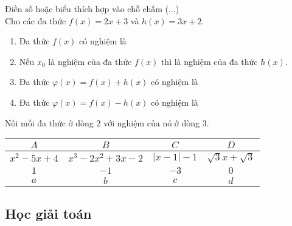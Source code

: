 \begin{ex}%
	Điền số hoặc biểu thích hợp vào chỗ chấm (...)\\
	Cho các đa thức $f(x)=2x+3$ và $h(x)=3x+2$.
	\begin{enumerate}
		\item Đa thức $f(x)$ có nghiệm là 
		\item Nếu $x_0$ là nghiệm của đa thức $f(x)$ thì  là nghiệm của đa thức $h(x)$.
		\item Đa thức $\varphi (x)=f(x)+h(x)$ có nghiệm là 
		\item Đa thức $\varphi (x)=f(x)-h(x)$ có nghiệm là 
	\end{enumerate}
\end{ex}

\begin{ex}%
	Nối mỗi đa thức ở dòng $2$ với nghiệm của nó ở dòng $3$.
	\begin{center}
		\begin{tabular}{|c|c|c|c|}
			\hline
			$A$ & $B$ & $C$ & $D$\\
			\hline
			$x^2-5x+4$&$x^3-2x^2+3x-2$&$|x-1|-1$& $\sqrt{3}x+\sqrt{3}$\\
			\hline
			$1$& $-1$& $-3$& $0$ \\
			\hline
			$a$& $b$& $c$& $d$ \\
			\hline
		\end{tabular}
	\end{center}
\end{ex}

\subsection{Học giải toán}

